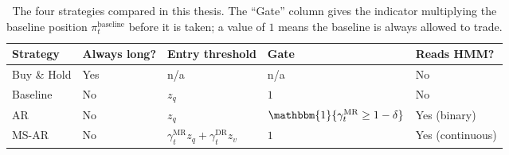 \begin{table}[htbp!]
\centering
\caption{The four strategies compared in this thesis. The ``Gate'' column gives the indicator multiplying the baseline position $\pi_t^{\mathrm{baseline}}$ before it is taken; a value of $1$ means the baseline is always allowed to trade.}
\label{tab:strategy_definitions}
\small
\begin{tabular}{lllll}
\toprule
\textbf{Strategy} & \textbf{Always long?} & \textbf{Entry threshold} & \textbf{Gate} & \textbf{Reads HMM?} \\
\midrule
Buy \& Hold & Yes & n/a & n/a & No \\
Baseline    & No  & $z_q$ & $1$ & No \\
AR          & No  & $z_q$ & $\mathbbm{1}\{\gamma_t^{\mathrm{MR}} \geq 1-\delta\}$ & Yes (binary) \\
MS-AR       & No  & $\gamma_t^{\mathrm{MR}} z_q + \gamma_t^{\mathrm{DR}} z_v$ & $1$ & Yes (continuous) \\
\bottomrule
\end{tabular}
\end{table}
